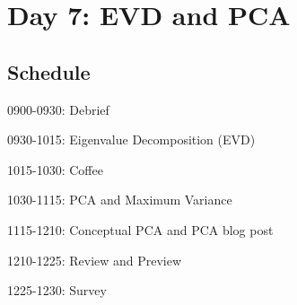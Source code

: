 

\chapter{Day 7: EVD and PCA}

\section{Schedule}
\bi
\item 0900-0930: Debrief
\item 0930-1015: Eigenvalue Decomposition (EVD)
\item 1015-1030: Coffee
\item 1030-1115: PCA and Maximum Variance
\item 1115-1210: Conceptual PCA and PCA blog post
\item 1210-1225: Review and Preview
\item 1225-1230: Survey
\ei




